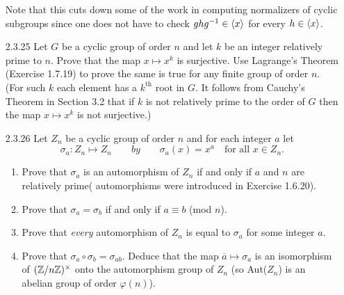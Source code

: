 \begin{enumerate}
\begin{enumerate}
                  \end{enumerate}
                  Note that this cuts down some of the work in computing
                  normalizers of cyclic subgroups since one does not have to
                  check $ghg^{-1} \in \langle x \rangle$ for every $h \in \langle x \rangle$.
   \item[2.3.25]  Let $G$ be a cyclic group of order $n$ and let $k$ be an
                  integer relatively prime to $n$. Prove that the map
                  $x \mapsto x^k$ is surjective. Use Lagrange's Theorem
                  (Exercise 1.7.19) to prove the same is true for any finite
                  group of order $n$. (For such $k$ each element has a
                  $k^{\text{th}}$ root in $G$. It follows from Cauchy's Theorem
                  in Section 3.2 that if $k$ is not relatively prime to the
                  order of $G$ then the map $x \mapsto x^k$ is not surjective.)
   \item[2.3.26]  Let $Z_n$ be a cyclic group of order $n$ and for each integer
                  $a$ let
                  $$\sigma_a : Z_n \mapsto Z_n \qquad by \qquad \sigma_a(x) =
                  x^a \quad \text{for all } x \in Z_n.$$
                  \begin{enumerate}
                     \item Prove that $\sigma_a$ is an automorphism of $Z_n$ if
                           and only if $a$ and $n$ are relatively prime(
                           automorphisms were introduced in Exercise 1.6.20).
                     \item Prove that $\sigma_a = \sigma_b$ if and only if
                           $a \equiv b$ (mod $n$).
                     \item Prove that \textit{every} automorphism of $Z_n$ is
                           equal to $\sigma_a$ for some integer $a$.
                     \item Prove that $\sigma_a\circ\sigma_b=\sigma_{ab}$.
                           Deduce that the map $\overline{a} \mapsto \sigma_a$
                           is an isomorphism of $(\mathbb{Z}/n\mathbb{Z})^\times$ onto the
                           automorphism group of $Z_n$ (so Aut($Z_n$) is an
                           abelian group of order $\varphi(n)$).
                  \end{enumerate}
\end{enumerate}

































